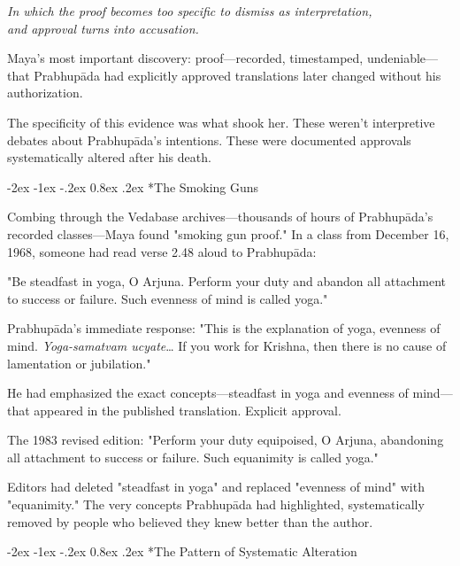 \documentclass[12pt,twoside]{book}
\makeatletter
\let\oldsubsection\subsection
\renewcommand{\subsection}[1]{\needspace{3\baselineskip}\oldsubsection{#1}}
\renewcommand\subsection{\@startsection{subsection}{2}{\z@}%
{-2ex \@plus -1ex \@minus -.2ex}%
{0.8ex \@plus .2ex}%
{\normalfont\large\bfseries}}
\makeatother
\begin{document}
{\centering\itshape In which the proof becomes too specific to dismiss as interpretation,\\and approval turns into accusation.\par}
\vspace{0.2cm}

\normalfont\justifying
Maya's most important discovery: proof—recorded, timestamped, undeniable—that Prabhupāda had explicitly approved translations later changed without his authorization.

The specificity of this evidence was what shook her. These weren't interpretive debates about Prabhupāda's intentions. These were documented approvals systematically altered after his death.

\vspace{0.1cm}
\subsection*{The Smoking Guns}

Combing through the Vedabase archives—thousands of hours of Prabhupāda's recorded classes—Maya found "smoking gun proof." In a class from December 16, 1968, someone had read verse 2.48 aloud to Prabhupāda:

"Be steadfast in yoga, O Arjuna. Perform your duty and abandon all attachment to success or failure. Such evenness of mind is called yoga."

Prabhupāda's immediate response: "This is the explanation of yoga, evenness of mind. \emph{Yoga-samatvam ucyate}\ldots{} If you work for Krishna, then there is no cause of lamentation or jubilation."

He had emphasized the exact concepts—steadfast in yoga and evenness of mind—that appeared in the published translation. Explicit approval.

The 1983 revised edition: "Perform your duty equipoised, O Arjuna, abandoning all attachment to success or failure. Such equanimity is called yoga."

Editors had deleted "steadfast in yoga" and replaced "evenness of mind" with "equanimity." The very concepts Prabhupāda had highlighted, systematically removed by people who believed they knew better than the author.


\vspace{0.1cm}
\subsection*{The Pattern of Systematic Alteration}
\end{document}
